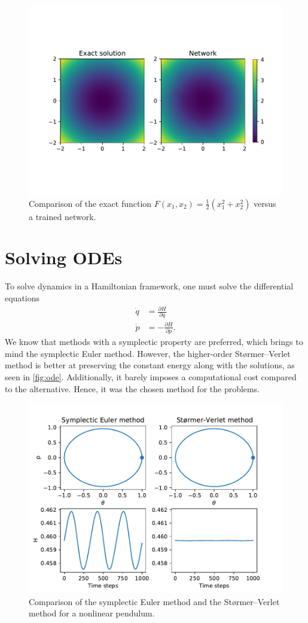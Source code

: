 \documentclass{article}
\begin{document}
\begin{figure}[h]
    \centering
    \includegraphics[width=\linewidth, trim={0 2cm 0 2.4cm}, clip]{2d.pdf}
    \caption{Comparison of the exact function $F(x_1,x_2)=\frac{1}{2}(x_1^2+x_2^2)$ versus a trained network.}
    \label{fig:2d}
\end{figure}

\section{Solving ODEs}
To solve dynamics in a Hamiltonian framework, one must solve the differential equations
\begin{align}
    \dot{q} &= \frac{\partial H}{\partial q} \label{eq:q} \\
    \dot p &= -\frac{\partial H}{\partial p}. \label{eq:p}
\end{align}
We know that methods with a symplectic property are preferred, which brings to mind the symplectic Euler method. However, the higher-order Størmer--Verlet method is better at preserving the constant energy along with the solutions, as seen in \autoref{fig:ode}. Additionally, it barely imposes a computational cost compared to the alternative. Hence, it was the chosen method for the problems. 
\begin{figure}[h]
    \centering
    \includegraphics[width=0.8\linewidth]{ode.pdf}
    \caption{Comparison of the symplectic Euler method and the Størmer--Verlet method for a nonlinear pendulum.}
    \label{fig:ode}
\end{figure}
\end{document}
